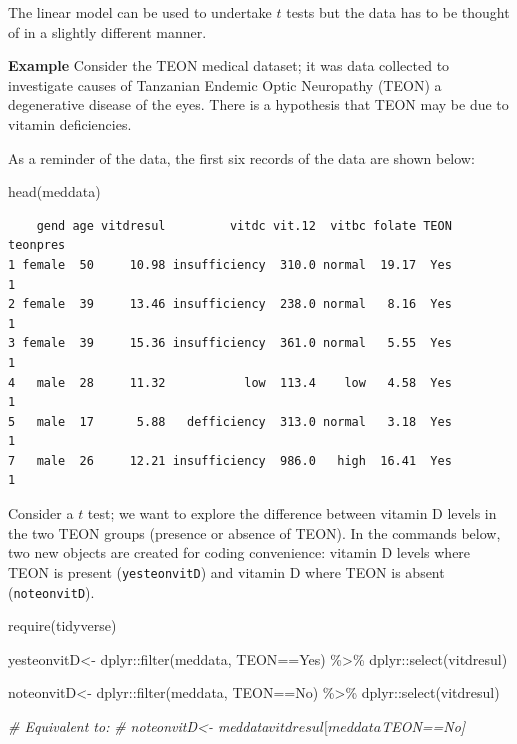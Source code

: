 \documentclass[
  oneside]{krantz}
\newenvironment{Shaded}{\begin{snugshade}}{\end{snugshade}}
\newcommand{\CommentTok}[1]{\textcolor[rgb]{0.56,0.35,0.01}{\textit{#1}}}
\newcommand{\FunctionTok}[1]{\textcolor[rgb]{0.00,0.00,0.00}{#1}}
\newcommand{\NormalTok}[1]{#1}
\newcommand{\OtherTok}[1]{\textcolor[rgb]{0.56,0.35,0.01}{#1}}
\newcommand{\SpecialCharTok}[1]{\textcolor[rgb]{0.00,0.00,0.00}{#1}}
\newcommand{\StringTok}[1]{\textcolor[rgb]{0.31,0.60,0.02}{#1}}
\begin{document}
The linear model can be used to undertake \(t\) tests but the data has to be thought of in a slightly different manner.

\textbf{Example} Consider the TEON medical dataset; it was data collected to investigate causes of Tanzanian Endemic Optic Neuropathy (TEON) a degenerative disease of the eyes. There is a hypothesis that TEON may be due to vitamin deficiencies.

As a reminder of the data, the first six records of the data are shown below:

\begin{Shaded}
\begin{Highlighting}[]
\FunctionTok{head}\NormalTok{(meddata)}
\end{Highlighting}
\end{Shaded}

\begin{verbatim}
    gend age vitdresul         vitdc vit.12  vitbc folate TEON teonpres
1 female  50     10.98 insufficiency  310.0 normal  19.17  Yes        1
2 female  39     13.46 insufficiency  238.0 normal   8.16  Yes        1
3 female  39     15.36 insufficiency  361.0 normal   5.55  Yes        1
4   male  28     11.32           low  113.4    low   4.58  Yes        1
5   male  17      5.88   defficiency  313.0 normal   3.18  Yes        1
7   male  26     12.21 insufficiency  986.0   high  16.41  Yes        1
\end{verbatim}

Consider a \(t\) test; we want to explore the difference between vitamin D levels in the two TEON groups (presence or absence of TEON). In the commands below, two new objects are created for coding convenience: vitamin D levels where TEON is present (\texttt{yesteonvitD}) and vitamin D where TEON is absent (\texttt{noteonvitD}).

\begin{Shaded}
\begin{Highlighting}[]
\FunctionTok{require}\NormalTok{(tidyverse)}

\NormalTok{yesteonvitD}\OtherTok{\textless{}{-}}\NormalTok{ dplyr}\SpecialCharTok{::}\FunctionTok{filter}\NormalTok{(meddata, TEON}\SpecialCharTok{==}\StringTok{\textquotesingle{}Yes\textquotesingle{}}\NormalTok{) }\SpecialCharTok{\%\textgreater{}\%}
\NormalTok{  dplyr}\SpecialCharTok{::}\FunctionTok{select}\NormalTok{(vitdresul)}

\NormalTok{noteonvitD}\OtherTok{\textless{}{-}}\NormalTok{ dplyr}\SpecialCharTok{::}\FunctionTok{filter}\NormalTok{(meddata, TEON}\SpecialCharTok{==}\StringTok{\textquotesingle{}No\textquotesingle{}}\NormalTok{) }\SpecialCharTok{\%\textgreater{}\%}
\NormalTok{  dplyr}\SpecialCharTok{::}\FunctionTok{select}\NormalTok{(vitdresul)}

\CommentTok{\# Equivalent to:}
\CommentTok{\# noteonvitD\textless{}{-} meddata$vitdresul[meddata$TEON==\textquotesingle{}No\textquotesingle{}]}
\end{Highlighting}
\end{Shaded}
\end{document}
